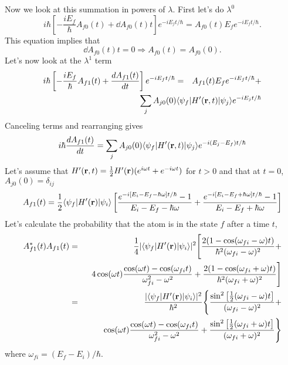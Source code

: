 Now we look at this summation in powers of $\lambda$.  First let's do
$\lambda^0$ 
\begin{equation}
i\hbar 
\left [
 -\frac{i E_f}{\hbar} A_{f0}(t) + \dd{A_{f0}(t)}{t} \right ] 
  e^{-iE_f t/\hbar} = A_{f0}(t) E_f e^{-iE_f t/\hbar}.
\label{eq:501}
\end{equation}
This equation implies that
\begin{equation}
\dd{A_{f0}(t)}{t}=0 \Rightarrow A_{f0}(t) = A_{f0}(0).
\label{eq:502}
\end{equation}
Let's now look at the $\lambda^1$ term 
\begin{eqnarray}
i\hbar \left [ -\frac{i E_f}{\hbar} A_{f1}(t) + \dd{A_{f1}(t)}{t}
  \right ]  e^{-iE_f t/\hbar} &=& 
  A_{f1}(t) E_f  
e^{-iE_f t/\hbar} + \nonumber \\ 
 & & \hspace{-1in} \sum_{j}  A_{j0}(0)  \langle\psi_f | H'({\bf r},t) |\psi_j \rangle
 e^{-iE_j t/\hbar}  
\label{eq:503}
\end{eqnarray}
Canceling terms and rearranging gives
\begin{equation}
i\hbar\frac{d {A_{f1}(t)}}{d {t}} =  \sum_{j}  A_{j0}(0)  \langle\psi_f | H'({\bf r},t) |\psi_j \rangle
 e^{-i(E_j-E_f) t/\hbar} 
\label{eq:504}
\end{equation}
Let's assume that $H'({\bf r},t) = \frac{1}{2} H'({\bf r}) (
e^{i\omega t} + e^{-i\omega t})$ for $t>0$
and that at $t=0$, $A_{j0}(0)=\delta_{ij}$
\begin{equation}
A_{f1}(t) = \frac{1}{2} \langle\psi_f | H'({\bf r}) |\psi_i \rangle 
\left [ \frac{e^{-i [  E_i - E_f - \hbar \omega ]
      t/\hbar}-1}{E_i-E_f-\hbar \omega} +
\frac{e^{-i [  E_i - E_f + \hbar \omega ] t/\hbar}-1}{E_i-E_f+\hbar
  \omega} \right ]
\label{eq:505}
\end{equation}
Let's calculate the probability that the atom is in the state $f$
after a time $t$,
\begin{eqnarray}
A^*_{f1}(t) A_{f1}(t) &=& \frac{1}{4} |\langle\psi_f | H'({\bf r}) |\psi_i \rangle
|^2
\Biggr [ \frac{2(1-\cos(\omega_{fi}-\omega)t)}{\hbar^2
    (\omega_{fi}-\omega)^2} + \nonumber \\ 
& & ~~
4 \cos(\omega t) \frac{\cos(\omega t)-\cos(\omega_{fi}
  t)}{\omega_{fi}^2-\omega^2} +
\frac{2(1-\cos(\omega_{fi}+\omega)t)}{\hbar^2 (\omega_{fi}+\omega)^2}
\Biggr ]
\\
&=&  \frac{|\langle\psi_f | H'({\bf r}) |\psi_i \rangle|^2}{\hbar^2}
 \Biggr \{
\frac{\sin^2 \left [ \frac{1}{2} ( \omega_{fi}-\omega ) t \right
]}{{ (\omega_{fi}-\omega)^2}} + \nonumber \\
& & ~~~ 
 \cos(\omega t) \frac{\cos(\omega t)-\cos(\omega_{fi}
  t)}{\omega_{fi}^2-\omega^2} +
\frac{\sin^2 \left [ \frac{1}{2} ( \omega_{fi}+\omega ) t \right
]}{{ (\omega_{fi}+\omega)^2}}\Biggr \} 
\label{eq:506}
\end{eqnarray}
where $\omega_{fi}=(E_f-E_i)/\hbar$.

